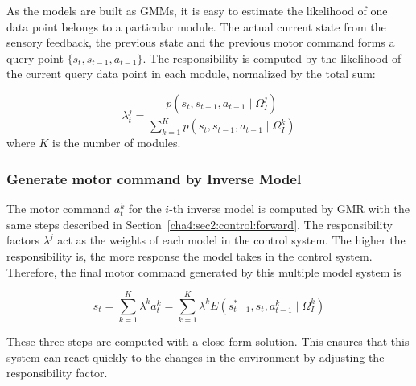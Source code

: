 As the models are built as GMMs, it is easy to estimate the likelihood of one data point belongs to a particular module. The actual current state from the sensory feedback, the previous state and the previous motor command forms a query point $\{s_t,s_{t-1},a_{t-1}\}$. The responsibility is computed by the likelihood of the current query data point in each module, normalized by the total sum:

\begin{equation}
\lambda^j_t = \frac{p(s_t,s_{t-1},a_{t-1}\mid \Omega_I^j)}{\sum_{k=1}^{K}{p(s_t,s_{t-1},a_{t-1}\mid \Omega_I^k)}}
\end{equation}
where $K$ is the number of modules.


\subsubsection{Generate motor command by Inverse Model}
\label{cha4:sec2:control:inverse}

The motor command $a^k_t$ for the $i$-th inverse model is computed by GMR with the same steps  described in Section~\ref{cha4:sec2:control:forward}. The responsibility factors $\lambda^j$ act as the weights of each model in the control system. The higher the responsibility is, the more response the model takes in the control system. Therefore, the final motor command generated by this multiple model system is

\begin{equation}
\label{equ:e_mix}
s_t = \sum_{k=1}^K{\lambda^k a_t^k} = \sum_{k=1}^K{\lambda^k E\left({s^*_{t+1},s_t, a^k_{t-1} \mid \Omega^k_I}\right)}
\end{equation}

These three steps are computed with a close form solution. This ensures that this system can react quickly to the changes in the environment by adjusting the responsibility factor.



